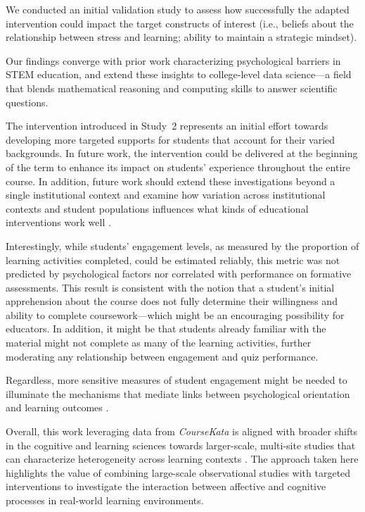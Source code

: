 \documentclass[10pt,letterpaper]{article}
\newcommand{\ck}{\textit{CourseKata}}
\begin{document}
We conducted an initial validation study to assess how successfully the adapted intervention could impact the target constructs of interest (i.e., beliefs about the relationship between stress and learning; ability to maintain a strategic mindset).


Our findings converge with prior work characterizing psychological barriers in STEM education, and extend these insights to college-level data science---a field that blends mathematical reasoning and computing skills to answer scientific questions. 

The intervention introduced in Study~2 represents an initial effort towards developing more targeted supports for students that account for their varied backgrounds. 
In future work, the intervention could be delivered at the beginning of the term to enhance its impact on students' experience throughout the entire course.
In addition, future work should extend these investigations beyond a single institutional context and examine how variation across institutional contexts and student populations influences what kinds of educational interventions work well \cite{jackson2024wise}.

Interestingly, while students' engagement levels, as measured by the proportion of learning activities completed, could be estimated reliably, this metric was not predicted by psychological factors nor correlated with performance on formative assessments.
This result is consistent with the notion that a student's initial apprehension about the course does not fully determine their willingness and ability to complete coursework---which might be an encouraging possibility for educators.
In addition, it might be that students already familiar with the material might not complete as many of the learning activities, further moderating any relationship between engagement and quiz performance. 

Regardless, more sensitive measures of student engagement might be needed to illuminate the mechanisms that mediate links between psychological orientation and learning outcomes \cite{arpasat2021applying,dewan2019engagement,gao2025predicting}. 

Overall, this work leveraging data from \ck{} is aligned with broader shifts in the cognitive and learning sciences towards larger-scale, multi-site studies that can characterize heterogeneity across learning contexts \cite{bryan2021behavioural,miller2019growth}.
The approach taken here highlights the value of combining large-scale observational studies with targeted interventions to investigate the interaction between affective and cognitive processes in real-world learning environments.
\end{document}

